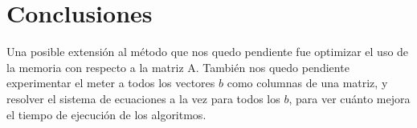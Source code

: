 \section{Conclusiones}

Una posible extensión al método que nos quedo pendiente fue optimizar el uso de la memoria con respecto a la matriz A. También nos quedo pendiente experimentar el meter a todos los vectores $b$ como columnas de una matriz, y resolver el sistema de ecuaciones a la vez para todos los $b$, para ver cuánto mejora el tiempo de ejecución de los algoritmos. 
